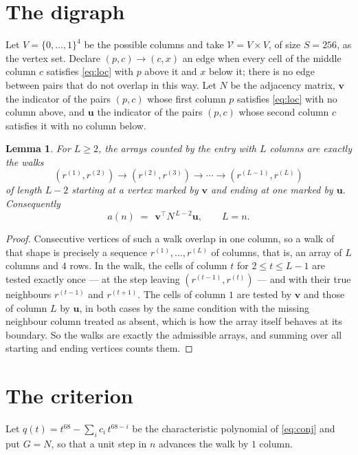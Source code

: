 \documentclass[11pt,a4paper]{article}
\theoremstyle{plain}
\newtheorem{lemma}[theorem]{Lemma}
\theoremstyle{definition}
\begin{document}
\section{The digraph}

Let $V=\{0,\dots,1\}^{4}$ be the possible columns and take
$\mathcal V=V\times V$, of size $S=256$, as the vertex set. Declare $(p,c)\to(c,x)$ an edge
when every cell of the middle column $c$ satisfies \eqref{eq:loc} with $p$ above it and $x$
below it; there is no edge between pairs that do not overlap in this way. Let $N$ be the
adjacency matrix, $\mathbf{v}$ the indicator of the pairs $(p,c)$ whose first column $p$
satisfies \eqref{eq:loc} with no column above, and $\mathbf{u}$ the indicator of
the pairs $(p,c)$ whose second column $c$ satisfies it with no column below.

\begin{lemma}\label{lem:walk}
For $L\ge2$, the arrays counted by the entry with $L$ columns are exactly the walks
\[
(r^{(1)},r^{(2)})\to(r^{(2)},r^{(3)})\to\cdots\to(r^{(L-1)},r^{(L)})
\]
of length $L-2$ starting at a vertex marked by $\mathbf{v}$ and ending at one marked by
$\mathbf{u}$. Consequently
\[
a(n)\;=\;\,\mathbf{v}^{\!\top}N^{\,L-2}\mathbf{u},\qquad L=n .
\]
\end{lemma}

\begin{proof}
Consecutive vertices of such a walk overlap in one column, so a walk of that shape is
precisely a sequence $r^{(1)},\dots,r^{(L)}$ of columns, that is, an array of $L$ columns
and $4$ rows. In the walk, the cells of column $t$ for $2\le t\le L-1$ are tested
exactly once --- at the step leaving $(r^{(t-1)},r^{(t)})$ --- and with their true
neighbours $r^{(t-1)}$ and $r^{(t+1)}$. The cells of column $1$ are tested by
$\mathbf{v}$ and those of column $L$ by $\mathbf{u}$, in both cases by the same condition
with the missing neighbour column treated as absent, which is how the array itself behaves at
its boundary. So the walks are exactly the admissible arrays, and summing over all starting
and ending vertices counts them.
\end{proof}

\section{The criterion}

Let $q(t)=t^{68}-\sum_i c_i\,t^{68-i}$ be the characteristic polynomial of
\eqref{eq:conj} and put $G=N$, so that a unit step in $n$ advances the walk by
$1$ column.
\end{document}
